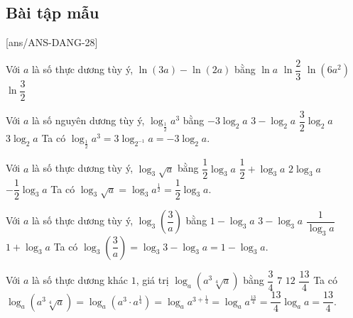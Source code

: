 \subsection{Bài tập mẫu}
[ans/ANS-DANG-28]
\begin{khung}
	\begin{vd}%
		Với $a$ là số thực dương tùy ý, $\ln (3 a)-\ln (2 a)$ bằng	
		\choice
		{$\ln a$}
		{$\ln \dfrac{2}{3}$}
		{$\ln \left(6 a^{2}\right)$}
		{$\ln \dfrac{3}{2}$}
	\end{vd}
\end{khung}

\begin{ex}%
	Với $a$ là số nguyên dương tùy ý, $\log_{\tfrac{1}{2}}a^3$ bằng
	\choice
	{ $-3\log_2 a$ }
	{\True $3-\log_2 a$ }
	{ $\dfrac{3}{2}\log_2 a$ }
	{ $3\log_2 a$ }
	\loigiai
	{
		Ta có $\log_{\tfrac{1}{2}}a^3=3\log_{2^{-1}}a=-3\log_2 a$.
	}
\end{ex}


\begin{ex}%
	Với $a$ là số thực dương tùy ý, $\log_3 \sqrt{a}$ bằng
	\choice
	{\True $\dfrac{1}{2}\log_3 a$ }
	{ $\dfrac{1}{2}+\log_3 a$ }
	{ $2\log_3 a$ }
	{ $-\dfrac{1}{2}\log_3 a$ }
	\loigiai
	{
		Ta có $\log_3 \sqrt{a}=\log_3 a^{\tfrac{1}{2}}=\dfrac{1}{2}\log_3 a$.
	}
\end{ex}


\begin{ex}%
	Với $a$ là số thực dương tùy ý, $\log_3\left(\dfrac{3}{a}\right)$ bằng
	\choice
	{\True $1-\log_3 a$ }
	{ $3-\log_3 a$ }
	{ $\dfrac{1}{\log_3 a}$ }
	{ $1+\log_3 a$ }
	\loigiai
	{
		Ta có $\log_3\left(\dfrac{3}{a}\right)=\log_3 3-\log_3 a=1-\log_3 a$.	
	}
\end{ex}


\begin{ex}%
	Với $a$ là số thực dương khác $1$, giá trị $\log_{a}\left(a^3\sqrt[4]{a}\right)$ bằng
	\choice
	{ $\dfrac{3}{4}$ }
	{ $7$ }
	{ $12$ }
	{\True $\dfrac{13}{4}$ }
	\loigiai
	{
		Ta có $\log_{a}\left(a^3\sqrt[4]{a}\right)=\log_a \left(a^3\cdot a^{\tfrac{1}{4}}\right)=\log_a a^{3+\tfrac{1}{4}}=\log_a a^{\tfrac{13}{4}}=\dfrac{13}{4}\log_a a=\dfrac{13}{4}$.	
	}
\end{ex}


